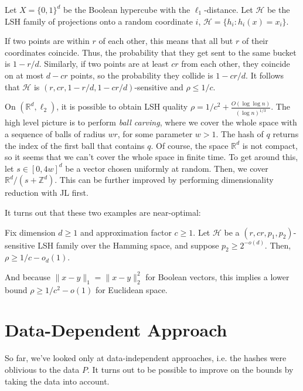 \begin{example}
Let $X = \{0,1\}^d$ be the Boolean hypercube with the $\ell_1$-distance. Let $\mathcal{H}$ be the LSH family of projections onto a random coordinate $i$, $\mathcal{H} = \{h_i: h_i(x) = x_i\}$.

If two points are within $r$ of each other, this means that all but $r$ of their coordinates coincide. Thus, the probability that they get sent to the same bucket is $1 - r / d$. Similarly, if two points are at least $cr$ from each other, they coincide on at most $d - cr$ points, so the probability they collide is $1 - cr / d$. It follows that $\mathcal{H}$ is $(r,cr,1 - r/d, 1 - cr/d)$-sensitive and $\rho \leq 1 / c$.
\end{example}


\begin{example}
On $(\mathbb{R}^d, \ell_2)$, it is possible to obtain LSH quality $\rho = 1/c^2 + \frac{O(\log \log n)}{(\log n)^{1/3}}$. The high level picture is to perform \emph{ball carving}, where we cover the whole space with a sequence of balls of radius $wr$, for some parameter $w > 1$. The hash of $q$ returns the index of the first ball that contains $q$. Of course, the space $\mathbb{R}^d$ is not compact, so it seems that we can't cover the whole space in finite time. To get around this, let $s \in [0,4w]^d$ be a vector chosen uniformly at random. Then, we cover $\mathbb{R}^d / (s + \mathbb{Z}^d)$. This can be further improved by performing dimensionality reduction with JL first.
\end{example}

It turns out that these two examples are near-optimal:
\begin{theorem}
Fix dimension $d \geq 1$ and approximation factor $c \geq 1$. Let $\mathcal{H}$ be a $(r,cr,p_1,p_2)$-sensitive LSH family over the Hamming space, and suppose $p_2 \geq 2^{-o(d)}$. Then, $\rho \geq 1 / c - o_d(1)$.
\end{theorem}

And because $\|x - y\|_1 = \|x - y\|_2^2$ for Boolean vectors, this implies a lower bound $\rho \geq 1 / c^2 - o(1)$ for Euclidean space.

\section{Data-Dependent Approach}
So far, we've looked only at data-independent approaches, i.e. the hashes were oblivious to the data $P$. It turns out to be possible to improve on the bounds by taking the data into account.

